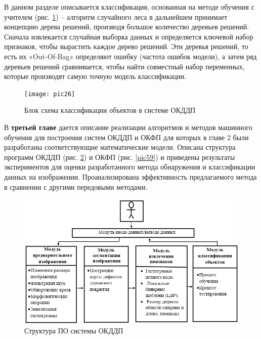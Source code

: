 В данном разделе описывается классификация, основанная на методе обучения с учителем (рис. \ref{pic26}) -- алгоритм случайного леса в дальнейшем принимает концепцию дерева решений, производя большое количество деревьев решений. Сначала извлекается случайная выборка данных и определяется ключевой набор признаков, чтобы вырастить каждое дерево решений. Эти деревья решений, то есть их «Out-Of-Bag» определяют ошибку (частота ошибок модели), а затем ряд деревьев решений сравнивается, чтобы найти совместный набор переменных, которые производят самую точную модель классификации.

\begin{figure}[ht!]
\centering
\texttt{[image: pic26]}
\caption{Блок схема классификации объектов в системе ОКДДП}
	\label{pic26}
		\end{figure}

В \textbf {третьей главе} дается описание реализации алгоритмов и методов машинного обучения для построения систем ОКДДП и ОКФП для которых в главе 2 были разработаны соответствующие математические модели. Описана структура программ ОКДДП (рис. \ref{pic47}) и ОКФП (рис. \ref{pic59}) и приведены результаты экспериментов для оценки разработанного метода обнаружения и классификации данных на изображении. Проанализирована эффективность предлагаемого метода в сравнении с другими передовыми методами.
\begin{figure}[ht!]
\centering
\vspace{-0.8em}
\includegraphics [width=1\linewidth]{images/pic47.png}
\caption{Структура ПО системы ОКДДП} \label{pic47}
\end{figure}

